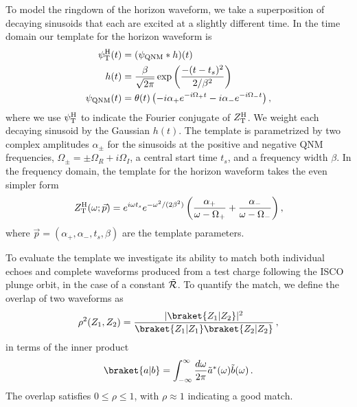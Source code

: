 \begin{refsection}
To model the ringdown of the horizon waveform, we take a superposition of decaying sinusoids that each are excited at a slightly different time.
In the time domain our template for the horizon waveform is
\begin{align}
\psi^{\rm H}_{\rm T}(t)&=(\psi_{\rm QNM}*h)(t) \nonumber \\
h(t)&=\frac{\beta}{\sqrt{2\pi}}\exp\left(\frac{-(t-t_s)^2}{2/\beta^2}\right) \nonumber \\
\psi_{\rm QNM}(t)&=\theta(t)\left(-i\alpha_+ e^{-i\Omega_+ t}-i\alpha_- e^{-i\Omega_- t}\right),
\end{align}
where we use $\psi_{\rm T}^{\rm H}$ to indicate the Fourier conjugate of $Z_{\rm T}^{\rm H}$. 
We weight each decaying sinusoid by the Gaussian $h(t)$. 
The template is parametrized by two complex amplitudes $\alpha_\pm$ for the sinusoids at the positive and negative QNM frequencies, $\Omega_\pm=\pm \Omega_R +i\Omega_I$, a central start time $t_s$, and a frequency width $\beta$. 
In the frequency domain, the template for the horizon waveform takes the even simpler form
\begin{align}
Z^{\rm H}_{\rm T}(\omega; \vec p)=e^{i\omega t_s}e^{-\omega^2/(2\beta^2)}\left(\frac{\alpha_+}{\omega-\Omega_+}+\frac{\alpha_-}{\omega-\Omega_-}\right),
\end{align}
where $\vec p=(\alpha_+,\alpha_-,t_s, \beta)$ are the template parameters.

To evaluate the template we investigate its ability to match both individual echoes and complete waveforms produced from a test charge following the ISCO plunge orbit, in the case of a constant $\tilde{\mathcal R}$.
To quantify the match, we define the overlap of two waveforms as
\begin{align}
\label{eq:overlap}
\rho^2(Z_1, Z_2)=\frac{|\braket{Z_1|Z_2}|^2}{\braket{Z_1|Z_1}\braket{Z_2|Z_2}} \,,
\end{align}
in terms of the inner product
\begin{align}
\braket{a|b}=\int_{-\infty}^\infty \frac{d\omega}{2\pi}\tilde a^*(\omega)\tilde b(\omega) \,.
\end{align}
The overlap satisfies $0 \leq \rho \leq 1$, with $\rho \approx 1$ indicating a good match.


\end{refsection}
